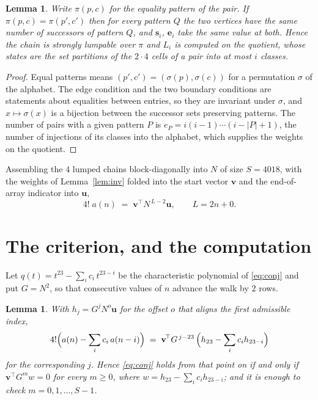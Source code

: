 \documentclass[11pt,a4paper]{article}
\theoremstyle{plain}
\newtheorem{lemma}[theorem]{Lemma}
\theoremstyle{definition}
\begin{document}
\begin{lemma}\label{lem:lump}
Write $\pi(p,c)$ for the equality pattern of the pair. If $\pi(p,c)=\pi(p',c')$ then for
every pattern $Q$ the two vertices have the same number of successors of pattern $Q$, and
$\mathbf{s}_i$, $\mathbf{e}_i$ take the same value at both. Hence the chain is strongly
lumpable over $\pi$ and $L_i$ is computed on the quotient, whose states are the set
partitions of the $2\cdot4$ cells of a pair into at most $i$ classes.
\end{lemma}

\begin{proof}
Equal patterns means $(p',c')=(\sigma(p),\sigma(c))$ for a permutation $\sigma$ of the
alphabet. The edge condition and the two boundary conditions are statements about equalities
between entries, so they are invariant under $\sigma$, and $x\mapsto\sigma(x)$ is a bijection
between the successor sets preserving patterns. The number of pairs with a given pattern $P$
is $e_P=i(i-1)\cdots(i-|P|+1)$, the number of injections of its classes into the alphabet,
which supplies the weights on the quotient.
\end{proof}

Assembling the $4$ lumped chains block-diagonally into $N$ of size $S=4018$, with the
weights of Lemma~\ref{lem:inv} folded into the start vector $\mathbf{v}$ and the
end-of-array indicator into $\mathbf{u}$,
\begin{equation}\label{eq:walk2}
4!\;a(n)\;=\;\mathbf{v}^{\!\top}N^{\,L-2}\mathbf{u},\qquad L=2n+0 .
\end{equation}

\section{The criterion, and the computation}

Let $q(t)=t^{23}-\sum_i c_i\,t^{23-i}$ be the characteristic polynomial of
\eqref{eq:conj} and put $G=N^{2}$, so that consecutive values of $n$ advance the
walk by $2$ rows.

\begin{lemma}\label{lem:crit}
With $h_j=G^{j}N^{o}\mathbf{u}$ for the offset $o$ that aligns the first admissible
index,
\[
4!\Bigl(a(n)-\sum_i c_i\,a(n-i)\Bigr)\;=\;\mathbf{v}^{\!\top}G^{\,j-23}\,
\Bigl(h_{23}-\sum_i c_i h_{23-i}\Bigr)
\]
for the corresponding $j$. Hence \eqref{eq:conj} holds from that point on if and only if
$\mathbf{v}^{\!\top}G^{m}w=0$ for every $m\ge0$, where
$w=h_{23}-\sum_i c_ih_{23-i}$; and it is enough to check $m=0,1,\dots,S-1$.
\end{lemma}
\end{document}
